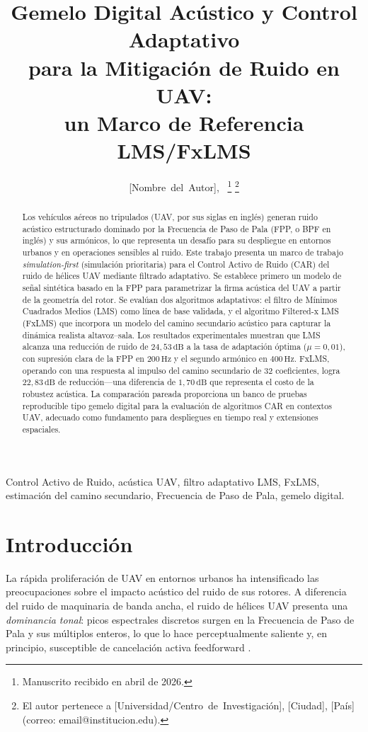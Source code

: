 \documentclass[journal,12pt,onecolumn]{IEEEtran}
\title{Gemelo Digital Acústico y Control Adaptativo\\
       para la Mitigación de Ruido en UAV:\\
       un Marco de Referencia LMS/FxLMS}
\author{[Nombre~del~Autor],~\IEEEmembership{Miembro~Estudiante,~IEEE}%
  \thanks{Manuscrito recibido en abril de 2026.}%
  \thanks{El autor pertenece a [Universidad/Centro~de~Investigación],
          [Ciudad], [País]
          (correo: email@institucion.edu).}}
\newcommand{\SI}[2]{\ensuremath{#1\,\mathrm{#2}}}
\begin{document}
\maketitle

\begin{abstract}
Los vehículos aéreos no tripulados (UAV, por sus siglas en inglés) generan
ruido acústico estructurado dominado por la Frecuencia de Paso de Pala
(FPP, o BPF en inglés) y sus armónicos, lo que representa un desafío para
su despliegue en entornos urbanos y en operaciones sensibles al ruido.
Este trabajo presenta un marco de trabajo \emph{simulation-first}
(simulación prioritaria) para el Control Activo de Ruido (CAR) del ruido
de hélices UAV mediante filtrado adaptativo.
Se establece primero un modelo de señal sintética basado en la FPP para
parametrizar la firma acústica del UAV a partir de la geometría del rotor.
Se evalúan dos algoritmos adaptativos: el filtro de Mínimos Cuadrados
Medios (LMS) como línea de base validada, y el algoritmo Filtered-x LMS
(FxLMS) que incorpora un modelo del camino secundario acústico para capturar
la dinámica realista altavoz--sala.
Los resultados experimentales muestran que LMS alcanza una reducción de
ruido de \SI{24,53}{dB} a la tasa de adaptación óptima ($\mu = 0{,}01$),
con supresión clara de la FPP en \SI{200}{Hz} y el segundo armónico
en \SI{400}{Hz}.
FxLMS, operando con una respuesta al impulso del camino secundario de
32 coeficientes, logra \SI{22,83}{dB} de reducción—una diferencia de
\SI{1,70}{dB} que representa el costo de la robustez acústica.
La comparación pareada proporciona un banco de pruebas reproducible tipo
gemelo digital para la evaluación de algoritmos CAR en contextos UAV,
adecuado como fundamento para despliegues en tiempo real y extensiones
espaciales.
\end{abstract}

\begin{IEEEkeywords}
Control Activo de Ruido, acústica UAV, filtro adaptativo LMS, FxLMS,
estimación del camino secundario, Frecuencia de Paso de Pala, gemelo digital.
\end{IEEEkeywords}

\section{Introducción}
\label{sec:intro}

La rápida proliferación de UAV en entornos urbanos ha intensificado las
preocupaciones sobre el impacto acústico del ruido de sus rotores.
A diferencia del ruido de maquinaria de banda ancha, el ruido de hélices
UAV presenta una \emph{dominancia tonal}: picos espectrales discretos
surgen en la Frecuencia de Paso de Pala y sus múltiplos enteros, lo que
lo hace perceptualmente saliente y, en principio, susceptible de cancelación
activa feedforward \cite{kuo1996, nelson1992}.
\end{document}
